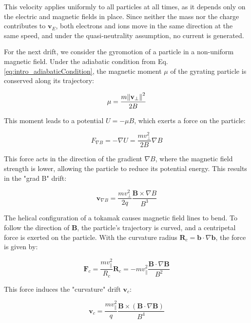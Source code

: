 This velocity applies uniformly to all particles at all times, as it depends only on the electric and magnetic fields in place. Since neither the mass nor the charge contributes to $\mathbf{v}_E$, both electrons and ions move in the same direction at the same speed, and under the quasi-neutrality assumption, no current is generated.

For the next drift, we consider the gyromotion of a particle in a non-uniform magnetic field. Under the adiabatic condition from Eq. \ref{eq:intro_adiabaticCondition}, the magnetic moment $\mu$ of the gyrating particle is conserved along its trajectory:

\begin{equation}
	\mu = \frac{m\norm{\mathbf{v}_\perp}^2}{2B}
\end{equation}

This moment leads to a potential $U = -\mu B$, which exerts a force on the particle:

\begin{equation}
	F_{\nabla B} = -\nabla U = \frac{mv_\perp^2}{2B}\nabla B
\end{equation}

This force acts in the direction of the gradient $\nabla B$, where the magnetic field strength is lower, allowing the particle to reduce its potential energy. This results in the "grad B" drift:

\begin{equation}
	\mathbf{v}_{\nabla B} = \frac{mv_\perp^2}{2q} \frac{\mathbf{B} \times \nabla B}{B^3}
\end{equation}

The helical configuration of a tokamak causes magnetic field lines to bend. To follow the direction of $\mathbf{B}$, the particle's trajectory is curved, and a centripetal force is exerted on the particle. With the curvature radius $\mathbf{R}_c = \mathbf{b} \cdot \nabla \mathbf{b}$, the force is given by:

\begin{equation}
	\mathbf{F}_c = \frac{mv_\parallel^2}{R_c}\mathbf{R}_c = -mv_\parallel^2\frac{\mathbf{B} \cdot \nabla \mathbf{B}}{B^2}
\end{equation}

This force induces the "curvature" drift $\mathbf{v}_c$:

\begin{equation}
	\mathbf{v}_c = \frac{mv_\parallel^2}{q}\frac{\mathbf{B} \times (\mathbf{B} \cdot \nabla \mathbf{B})}{B^4}
\end{equation}

